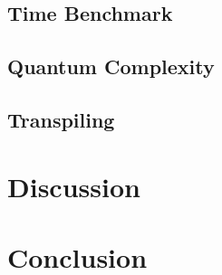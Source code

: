 \documentclass[conference]{IEEEtran}
\begin{document}
\subsection{Time Benchmark}

\subsection{Quantum Complexity}

\subsection{Transpiling}


\section{Discussion}

\section{Conclusion}



\end{document}
